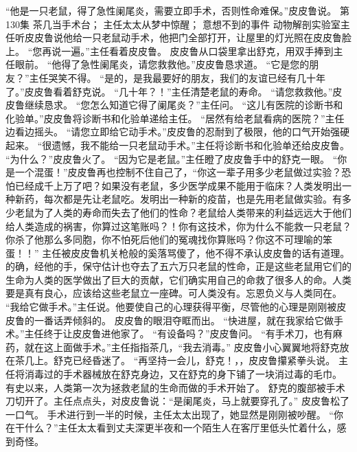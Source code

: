 \documentclass[a4paper,12pt,UTF8,twoside]{ctexbook}
\begin{document}
        “他是一只老鼠，得了急性阑尾炎，需要立即手术，否则性命难保。”皮皮鲁说。   第130集 
        茶几当手术台； 
        主任太太从梦中惊醒； 
        意想不到的事件   
        动物解剖实验室主任听皮皮鲁说他给一只老鼠动手术，他把门全部打开，让屋里的灯光照在皮皮鲁脸上。 
        “您再说一遍。”主任看着皮皮鲁。 
        皮皮鲁从口袋里拿出舒克，用双手捧到主任眼前。 
        “他得了急性阑尾炎，请您救救他。”皮皮鲁恳求道。 
        “它是您的朋友？”主任哭笑不得。 
        “是的，是我最要好的朋友，我们的友谊已经有几十年了。”皮皮鲁看着舒克说。 
        “几十年？！”主任清楚老鼠的寿命。 
        “请您救救他。”皮皮鲁继续恳求。 
        “您怎么知道它得了阑尾炎？”主任问。 
        “这儿有医院的诊断书和化验单。”皮皮鲁将诊断书和化验单递给主任。 
        “居然有给老鼠看病的医院？”主任边看边摇头。 
        “请您立即给它动手术。”皮皮鲁的忍耐到了极限，他的口气开始强硬起来。 
        “很遗憾，我不能给一只老鼠动手术。”主任将诊断书和化验单还给皮皮鲁。 
        “为什么？”皮皮鲁火了。 
        “因为它是老鼠。”主任瞪了皮皮鲁手中的舒克一眼。 
        “你是一个混蛋！”皮皮鲁再也控制不住自己了，“你这一辈子用多少老鼠做过实验？恐怕已经成千上万了吧？如果没有老鼠，多少医学成果不能用于临床？人类发明出一种新药，每次都是先让老鼠吃。发明出一种新的疫苗，也是先用老鼠做实验。有多少老鼠为了人类的寿命而失去了他们的性命？老鼠给人类带来的利益远远大于他们给人类造成的祸害，你算过这笔账吗？！你有这技术，你为什么不能救一只老鼠？你杀了他那么多同胞，你不怕死后他们的冤魂找你算账吗？你这不可理喻的笨蛋！！” 
        主任被皮皮鲁机关枪般的奚落骂傻了，他不得不承认皮皮鲁的话有道理。的确，经他的手，保守估计也夺去了五六万只老鼠的性命，正是这些老鼠用它们的生命为人类的医学做出了巨大的贡献，它们确实用自己的命救了很多人的命。人类要是真有良心，应该给这些老鼠立一座碑。可人类没有。忘恩负义与人类同在。 
        “我给它做手术。”主任说。他要使自己的心理获得平衡，尽管他的心理是刚刚被皮皮鲁的一番话弄倾斜的。 
        皮皮鲁的眼泪夺眶而出。 
        “快进屋，就在我家给它做手术。”主任终于让皮皮鲁进他家了。 
        “有设备吗？”皮皮鲁问。 
        “有手术刀，也有麻药，就在这上面做手术。”主任指指茶几，“我去消毒。” 
        皮皮鲁小心翼翼地将舒克放在茶几上。舒克已经昏迷了。 
        “再坚持一会儿，舒克！，，皮皮鲁攥紧拳头说。 
        主任将消毒过的手术器械放在舒克身边，又在舒克的身下铺了一块消过毒的毛巾。 
        有史以来，人类第一次为拯救老鼠的生命而做的手术开始了。 
        舒克的腹部被手术刀切开了。主任点点头，对皮皮鲁说：“是阑尾炎，马上就要穿孔了。” 
        皮皮鲁松了一口气。 
        手术进行到一半的时候，主任太太出现了，她显然是刚刚被吵醒。 
        “你在干什么？”主任太太看到丈夫深更半夜和一个陌生人在客厅里低头忙着什么，感到奇怪。 
\end{document}
